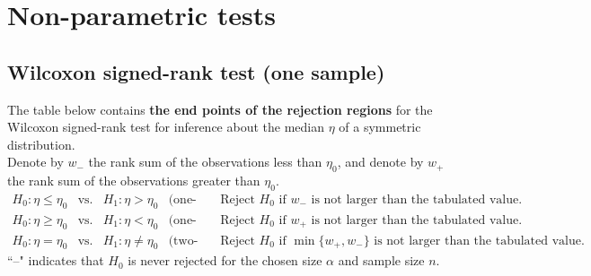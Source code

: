 \section{Non-parametric tests}
\subsection{Wilcoxon signed-rank test (one sample)}
\noindent The table below contains \textbf{the end points of the rejection regions} for the Wilcoxon signed-rank test for inference about the median $\eta$ of a symmetric distribution. \\[5pt]
Denote by $w_-$ the rank sum of the observations less than $\eta_0$, and denote by $w_+$ the rank sum of the observations greater than $\eta_0$.
\[
\begin{array}{rclll}
	H_0:\eta\le \eta_0 & \text{vs.} & H_1:\eta>\eta_0
	& \text{(one-sided):} & \text{Reject $H_0$ if $w_-$ is not larger than the tabulated value.}\\
	H_0:\eta\ge \eta_0 & \text{vs.} & H_1:\eta<\eta_0
	& \text{(one-sided):} & \text{Reject $H_0$ if $w_+$ is not larger than the tabulated value.}\\
	H_0:\eta=\eta_0 & \text{vs.} & H_1:\eta\ne\eta_0
	& \text{(two-sided):} & \text{Reject $H_0$ if $\min\{w_+,w_-\}$ is not larger than the tabulated value.}
\end{array}
\]
``--" indicates that $H_0$ is never rejected for the chosen size $\alpha$ and sample size $n$.

~\\

